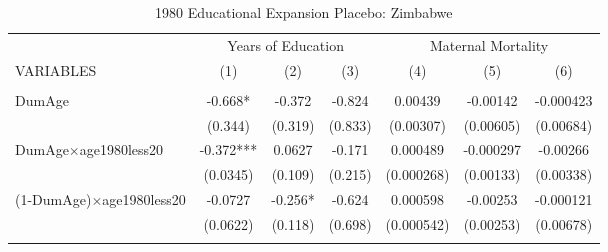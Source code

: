 \begin{landscape}\begin{table}[htpb!]\begin{center}
\caption{1980 Educational Expansion Placebo: Zimbabwe}
\label{MMRtab:ZimbabwePlacebo}\begin{tabular}{lcccccc}\toprule
& \multicolumn{3}{c}{Years of Education}&\multicolumn{3}{c}{Maternal Mortality }\\VARIABLES & (1)&(2)&(3)&(4)&(5)&(6)\\ \cmidrule(r){1-4} \cmidrule(r){5-7}\begin{footnotesize}\end{footnotesize}&\begin{footnotesize}\end{footnotesize}&\begin{footnotesize}\end{footnotesize}&\begin{footnotesize}\end{footnotesize}&\begin{footnotesize}\end{footnotesize}&\begin{footnotesize}\end{footnotesize}\\ 
DumAge&-0.668*&-0.372&-0.824&0.00439&-0.00142&-0.000423\\
&(0.344)&(0.319)&(0.833)&(0.00307)&(0.00605)&(0.00684)\\
DumAge$\times$age1980less20&-0.372***&0.0627&-0.171&0.000489&-0.000297&-0.00266\\
&(0.0345)&(0.109)&(0.215)&(0.000268)&(0.00133)&(0.00338)\\
(1-DumAge)$\times$age1980less20&-0.0727&-0.256*&-0.624&0.000598&-0.00253&-0.000121\\
&(0.0622)&(0.118)&(0.698)&(0.000542)&(0.00253)&(0.00678)\\
\begin{footnotesize}\end{footnotesize}&\begin{footnotesize}\end{footnotesize}&\begin{footnotesize}\end{footnotesize}&\begin{footnotesize}\end{footnotesize}&\begin{footnotesize}\end{footnotesize}&\begin{footnotesize}\end{footnotesize}\\ 

\end{tabular}
\end{center}
\end{table}
\end{landscape}
